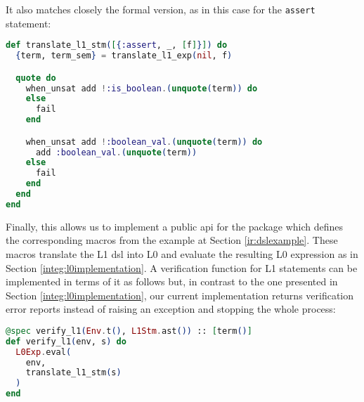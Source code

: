 It also matches closely the formal version, as in this case for the 
\verb|assert| statement:

\begin{lstlisting}[language=elixir,numbers=none,frame=none]
def translate_l1_stm([{:assert, _, [f]}]) do
  {term, term_sem} = translate_l1_exp(nil, f)

  quote do
    when_unsat add !:is_boolean.(unquote(term)) do
    else
      fail
    end

    when_unsat add !:boolean_val.(unquote(term)) do
      add :boolean_val.(unquote(term))
    else
      fail
    end
  end
end
\end{lstlisting}

Finally, this allows us to implement a public \gls{api} for the package which
defines the corresponding macros from the example at Section
\ref{ir:dslexample}. These macros translate the L1 \gls{dsl} into L0 and
evaluate the resulting L0 expression as in Section \ref{integ:l0implementation}.
A verification function for L1 statements can be implemented in terms of it as
follows but, in contrast to the one presented in Section
\ref{integ:l0implementation}, our current implementation returns verification
error reports instead of raising an exception and stopping the whole process:

\begin{lstlisting}[language=elixir,numbers=none,frame=none]
@spec verify_l1(Env.t(), L1Stm.ast()) :: [term()]
def verify_l1(env, s) do
  L0Exp.eval(
    env,
    translate_l1_stm(s)
  )
end
\end{lstlisting}
